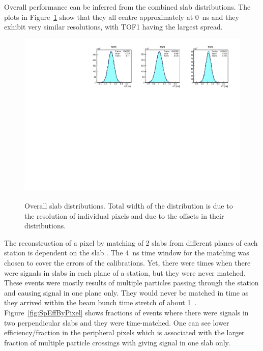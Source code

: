 Overall performance can be inferred from the combined slab \DT{}
distributions. The plots in Figure~\ref{fig:SlabDtAll} show that they all centre
approximately at 0~ns and they exhibit very similar resolutions, with TOF1
having the largest spread.


\begin{figure}
  \begin{center}
  \includegraphics[width=0.9\columnwidth]{07_overall_slab_dt} \\
  \caption{Overall slab \DT{} distributions. Total width of the
    distribution is due to the resolution of individual pixels and due to
    the offsets in their \DT{} distributions.}
  \label{fig:SlabDtAll}
  \end{center}
\end{figure}


The reconstruction of a pixel by matching of 2 slabs from different
planes of each station is dependent on the slab \DT{}. The 4~ns time
window for the matching was chosen to cover the errors of the
calibrations. Yet, there were times when there were signals in slabs
in each plane of a station, but they were never matched. These events
were mostly results of multiple particles passing through the station
and causing signal in one plane only. They would never be matched in
time as they arrived within the beam bunch time stretch of about
1~\us{}. Figure~\ref{fig:SpEffByPixel} shows fractions of events where
there were signals in two perpendicular slabs and they were
time-matched. One can see lower efficiency/fraction in the peripheral
pixels which is associated with the larger fraction of multiple
particle crossings with giving signal in one slab only.



